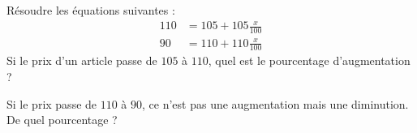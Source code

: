 
\begin{exercice}\label{exoSeconde-0031}

    Résoudre les équations suivantes :
    \begin{subequations}
        \begin{align}
            110&=105+105\frac{ x }{ 100 }\\
            90&=110+110\frac{ x }{ 100 }
        \end{align}
    \end{subequations}
    Si le prix d'un article passe de \( 105\) à \( 110\), quel est le pourcentage d'augmentation ?

    Si le prix passe de \( 110\) à \( 90\), ce n'est pas une augmentation mais une diminution. De quel pourcentage ?
\end{exercice}
